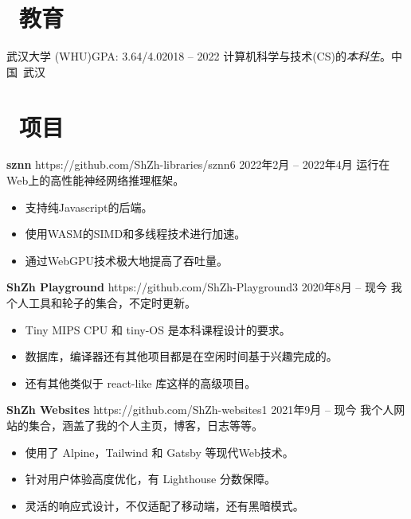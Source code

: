 \documentclass{common}
\begin{document}

\section{\faGraduationCap\ 教育}
\educationsubsection
    {武汉大学 (WHU)}{GPA: 3.64/4.0}{2018 -- 2022}
    {计算机科学与技术(CS)的\textit{本科生}。}{中国\ 武汉}

\section{\faCubes\ 项目}
\projectsubsection
    {\textbf{sznn}}
    {https://github.com/ShZh-libraries/sznn}{6}
    {2022年2月 -- 2022年4月}
运行在Web上的高性能神经网络推理框架。
\begin{itemize}
    \item 支持纯Javascript的后端。
    \item 使用WASM的SIMD和多线程技术进行加速。
    \item 通过WebGPU技术极大地提高了吞吐量。
\end{itemize}
\projectsubsection
    {\textbf{ShZh Playground}}
    {https://github.com/ShZh-Playground}{3}
    {2020年8月 -- 现今}
我个人工具和轮子的集合，不定时更新。
\begin{itemize}
    \item Tiny MIPS CPU 和 tiny-OS 是本科课程设计的要求。
    \item 数据库，编译器还有其他项目都是在空闲时间基于兴趣完成的。
    \item 还有其他类似于 react-like 库这样的高级项目。
\end{itemize}
\projectsubsection
    {\textbf{ShZh Websites}}
    {https://github.com/ShZh-websites}{1}
    {2021年9月 -- 现今}
我个人网站的集合，涵盖了我的个人主页，博客，日志等等。
\begin{itemize}
    \item 使用了 Alpine，Tailwind 和 Gatsby 等现代Web技术。
    \item 针对用户体验高度优化，有 Lighthouse 分数保障。
    \item 灵活的响应式设计，不仅适配了移动端，还有黑暗模式。
\end{itemize}
\end{document}
